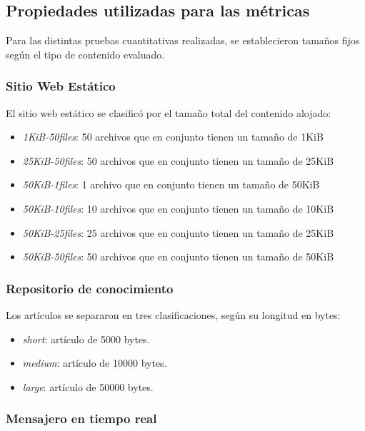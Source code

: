 \subsection{Propiedades utilizadas para las métricas}

Para las distintas pruebas cuantitativas realizadas, se establecieron tamaños fijos según el tipo de contenido evaluado.

\subsubsection{Sitio Web Estático}

El sitio web estático se clasificó por el tamaño total del contenido alojado:

\begin{itemize}
    \item \textit{1KiB-50files}: 50 archivos que en conjunto tienen un tamaño de 1KiB
    \item \textit{25KiB-50files}: 50 archivos que en conjunto tienen un tamaño de 25KiB
    \item \textit{50KiB-1files}: 1 archivo que en conjunto tienen un tamaño de 50KiB
    \item \textit{50KiB-10files}: 10 archivos que en conjunto tienen un tamaño de 10KiB
    \item \textit{50KiB-25files}: 25 archivos que en conjunto tienen un tamaño de 25KiB
    \item \textit{50KiB-50files}: 50 archivos que en conjunto tienen un tamaño de 50KiB    
\end{itemize}

\subsubsection{Repositorio de conocimiento}

Los artículos se separaron en tres clasificaciones, según su longitud en bytes:

\begin{itemize}
    \item \textit{short}: artículo de 5000 bytes.
    \item \textit{medium}: artículo de 10000 bytes.
    \item \textit{large}: artículo de 50000 bytes.
\end{itemize}

\subsubsection{Mensajero en tiempo real}

